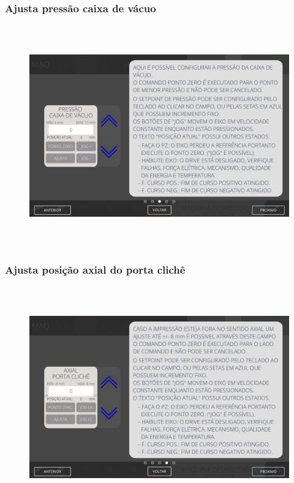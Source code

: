 \newpage
\thispagestyle{fancy}
\vspace*{40 pt}
\subsubsection{\small{Ajusta pressão caixa de vácuo}}\label{ajustaPressaoCaixaVacuo}
\vspace*{\fill}
\begin{figure}[h]
  \centering
  \includegraphics[width=576px,height=360px]{src/imagesFlexo/04-printter/02-printter/settings/e-3.png}
\end{figure}
\vspace*{\fill}

\newpage
\thispagestyle{fancy}
\vspace*{40 pt}
\subsubsection{\small{Ajusta posição axial do porta clichê}}\label{ajustaPosicaoAxialPortaCliche}
\vspace*{\fill}
\begin{figure}[h]
  \centering
  \includegraphics[width=576px,height=360px]{src/imagesFlexo/04-printter/02-printter/settings/e-4.png}
\end{figure}
\vspace*{\fill}

